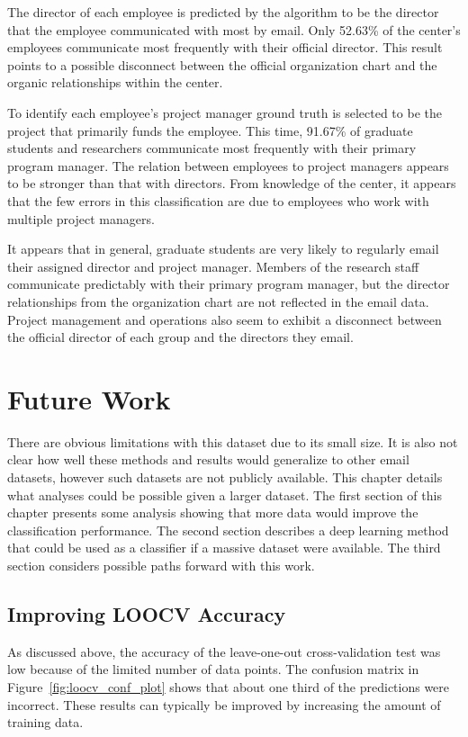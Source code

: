 \documentclass[12pt]{report}
\begin{document}
The director of each employee is predicted by the algorithm to be the director that the employee communicated with most by email.
Only 52.63\% of the center's employees communicate most frequently with their official director.
This result points to a possible disconnect between the official organization chart and the organic relationships within the center.

To identify each employee's project manager ground truth is selected to be the project that primarily funds the employee.
This time, 91.67\% of graduate students and researchers communicate most frequently with their primary program manager.
The relation between employees to project managers appears to be stronger than that with directors.
From knowledge of the center, it appears that the few errors in this classification are due to employees who work with multiple project managers.  

It appears that in general, graduate students are very likely to regularly email their assigned director and project manager.
Members of the research staff communicate predictably with their primary program manager, but the director relationships from the organization chart are not reflected in the email data.
Project management and operations also seem to exhibit a disconnect between the official director of each group and the directors they email.


\chapter{Future Work} \label{FutureWork}
There are obvious limitations with this dataset due to its small size.
It is also not clear how well these methods and results would generalize to other email datasets, however such datasets are not publicly available.
This chapter details what analyses could be possible given a larger dataset.
The first section of this chapter presents some analysis showing that more data would improve the classification performance.
The second section describes a deep learning method that could be used as a classifier if a massive dataset were available.
The third section considers possible paths forward with this work.
\section{Improving LOOCV Accuracy}
As discussed above, the accuracy of the leave-one-out cross-validation test was low because of the limited number of data points.
The confusion matrix in Figure~\ref{fig:loocv_conf_plot} shows that about one third of the predictions were incorrect.  
These results can typically be improved by increasing the amount of training data. 
\end{document}
